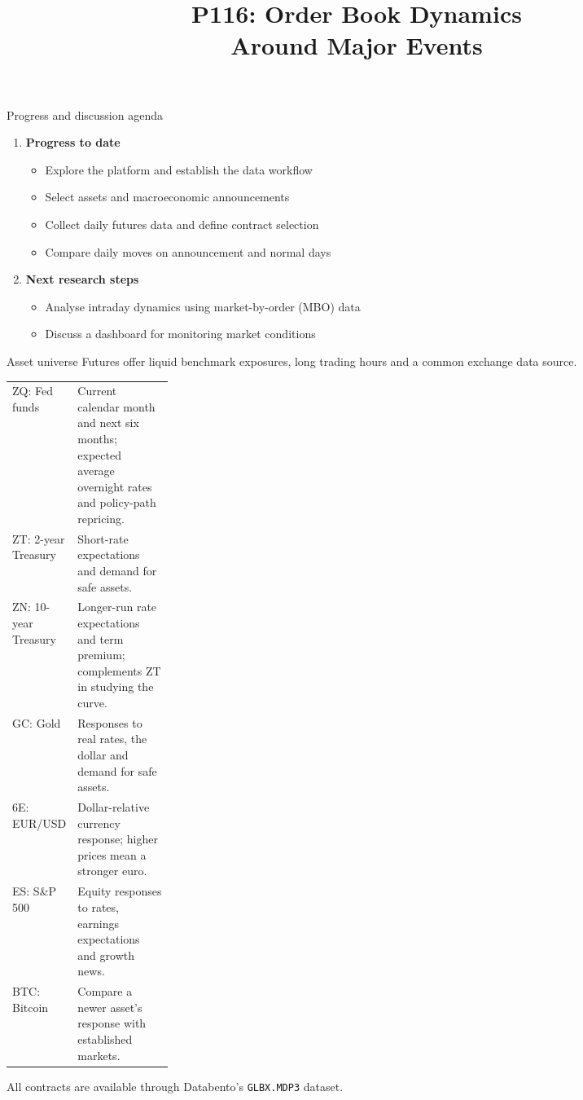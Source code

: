 \documentclass[aspectratio=169,10pt]{beamer}
\title{P116: Order Book Dynamics\\Around Major Events}
\author{}
\date{}
\begin{document}
\begin{frame}[plain]
\centering
\titlepage
\end{frame}

\begin{frame}{Progress and discussion agenda}
\begin{enumerate}
\item \textbf{Progress to date}
  \begin{itemize}
  \item Explore the platform and establish the data workflow
  \item Select assets and macroeconomic announcements
  \item Collect daily futures data and define contract selection
  \item Compare daily moves on announcement and normal days
  \end{itemize}
\item \textbf{Next research steps}
  \begin{itemize}
  \item Analyse intraday dynamics using market-by-order (MBO) data
  \item Discuss a dashboard for monitoring market conditions
  \end{itemize}
\end{enumerate}
\end{frame}

\begin{frame}{Asset universe}
\small
Futures offer liquid benchmark exposures, long trading hours and a common exchange data source.
\medskip
{\renewcommand{\arraystretch}{1.25}
\begin{tabularx}{\linewidth}{@{}>{\raggedright\arraybackslash}p{0.23\linewidth}>{\raggedright\arraybackslash}X@{}}
\textcolor{databentopurple}{ZQ: Fed funds} & Current calendar month and next six months; expected average overnight rates and policy-path repricing. \\
\textcolor{databentopurple}{ZT: 2-year Treasury} & Short-rate expectations and demand for safe assets. \\
\textcolor{databentopurple}{ZN: 10-year Treasury} & Longer-run rate expectations and term premium; complements ZT in studying the curve. \\
\textcolor{databentopurple}{GC: Gold} & Responses to real rates, the dollar and demand for safe assets. \\
\textcolor{databentopurple}{6E: EUR/USD} & Dollar-relative currency response; higher prices mean a stronger euro. \\
\textcolor{databentopurple}{ES: S\&P 500} & Equity responses to rates, earnings expectations and growth news. \\
\textcolor{databentopurple}{BTC: Bitcoin} & Compare a newer asset's response with established markets.
\end{tabularx}}
\medskip

All contracts are available through Databento's \texttt{GLBX.MDP3} dataset.
\end{frame}
\end{document}
